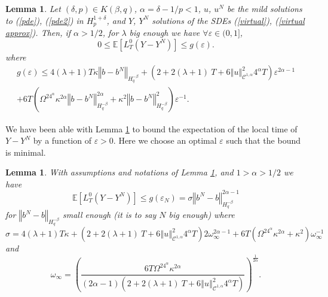 \documentclass[11pt]{enstaPRE}
\newtheorem{lem}[theo]{Lemma}
\newcommand{\norme}[1]{\left\Vert #1\right\Vert}
\newcommand{\E}{\mathbb{E}}
\begin{document}
\begin{lem}\label{local time}
    Let $(\delta,p)\in K(\beta,q)$, $\alpha=\delta-1/p<1$, $u$, $u^N$ be the mild solutions to (\ref{pde}), (\ref{pde2}) in $H_p^{1+\delta}$, and $Y$, $Y^N$ solutions of the SDEs (\ref{virtual}), (\ref{virtual approx}).  Then, if $\alpha>1/2$, for $\lambda$ big enough we have $\forall\varepsilon\in(0,1]$,
    \begin{equation*}
    0\leq \E\left[L^0_T(Y-Y^N)\right]\leq  g(\varepsilon).
    \end{equation*}
    where \begin{multline*}
    g(\varepsilon) \leq 4(\lambda + 1)T\kappa\norme{b-b^N}_{H^{-\beta}_{q}} + \left(2 + 2(\lambda + 1)\ T + 6\norme{u}_{\mathcal{C}^{1,\alpha}}^2 4^{\alpha}T\right) \varepsilon^{2\alpha-1} \\ + 6T\left(\Omega^24^{\alpha}\kappa^{2\alpha} \norme{b-b^N}_{H^{-\beta}_q}^{2\alpha}+\kappa^2\norme{b-b^N}_{H^{-\beta}_{q}}^2\right)\varepsilon^{-1}.
    \end{multline*}
    
\end{lem}

We have been able with Lemma \ref{local time} to bound the expectation of the local time of $Y-Y^N$ by a function of $\varepsilon>0$. Here we choose an optimal $\varepsilon$ such that the bound is minimal.

\begin{lem}\label{key lemma}
    With assumptions and notations of Lemma \ref{local time}, and $1>\alpha>1/2$ we have
    \begin{equation}
    \E\left[L^0_T(Y-Y^N)\right]\leq g(\varepsilon_N) = \sigma\norme{b^N-b}_{H^{-\beta}_{q}}^{2\alpha-1}
    \end{equation}
    for $\norme{b^N-b}_{H^{-\beta}_{q}}$ small enough (it is to say $N$ big enough) where \begin{equation*}
    \sigma = 4(\lambda + 1)T\kappa + \left(2 + 2(\lambda + 1)\ T + 6\norme{u}_{\mathcal{C}^{1,\alpha}}^2 4^{\alpha}T\right) 2\omega_\infty^{2\alpha-1} + 6T\left(\Omega^24^{\alpha}\kappa^{2\alpha} +\kappa^2\right)\omega_\infty^{-1}
    \end{equation*} and \begin{equation*}
    \omega_\infty=\left(\frac{6T\Omega^24^{\alpha}\kappa^{2\alpha} }{(2\alpha-1)\left(2 + 2(\lambda + 1)\ T + 6\norme{u}_{\mathcal{C}^{1,\alpha}}^2 4^{\alpha}T\right)}\right)^{\frac{1}{2\alpha}}.
    \end{equation*}
\end{lem}
\end{document}
